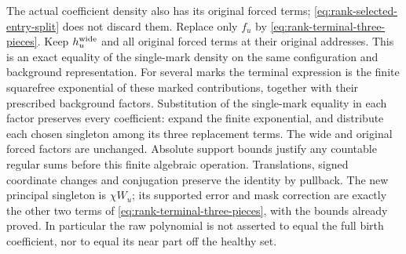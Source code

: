 The actual coefficient density also has its original forced terms;
\eqref{eq:rank-selected-entry-split} does not discard them. Replace
only $f_u$ by \eqref{eq:rank-terminal-three-pieces}. Keep
$h_u^{\rm wide}$ and all original forced terms at their original
addresses. This is an exact equality of the single-mark density on
the same configuration and background representation. For several
marks the terminal expression is the finite squarefree exponential
of these marked contributions, together with their prescribed
background factors. Substitution of the single-mark equality in
each factor preserves every coefficient: expand the finite exponential,
and distribute each chosen singleton among its three replacement
terms. The wide and original forced factors are unchanged. Absolute
support bounds justify any countable regular sums before this finite
algebraic operation. Translations, signed coordinate changes and
conjugation preserve the identity by pullback. The new principal
singleton is $\chi W_u$; its supported error and mask correction
are exactly the other two terms of
\eqref{eq:rank-terminal-three-pieces}, with the bounds already proved.
In particular the raw polynomial is not asserted to equal the full
birth coefficient, nor to equal its near part off the healthy set.

